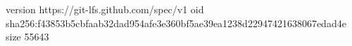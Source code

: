 version https://git-lfs.github.com/spec/v1
oid sha256:f43853b5cbfaab32dad954afe3e360bf5ae39ea1238d22947421638067edad4e
size 55643
